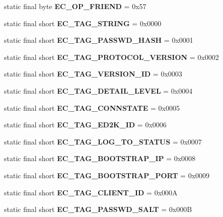 \begin{DoxyCompactItemize}
\item 
static final byte {\bfseries EC\_\-OP\_\-FRIEND} = 0x57\label{interfaceECCodes_a10bfecdbb1cc2c79bb9e923ce445c28b}

\item 
static final short {\bfseries EC\_\-TAG\_\-STRING} = 0x0000\label{interfaceECCodes_a87886149b79ca2ed2e123476cb9410b1}

\item 
static final short {\bfseries EC\_\-TAG\_\-PASSWD\_\-HASH} = 0x0001\label{interfaceECCodes_af173ae339225661cd5433189fec1436a}

\item 
static final short {\bfseries EC\_\-TAG\_\-PROTOCOL\_\-VERSION} = 0x0002\label{interfaceECCodes_a3a16cfe5eee80c6a86da32ccba5cba72}

\item 
static final short {\bfseries EC\_\-TAG\_\-VERSION\_\-ID} = 0x0003\label{interfaceECCodes_a157944884bcc9ddff5e21fd1bd7a3dcf}

\item 
static final short {\bfseries EC\_\-TAG\_\-DETAIL\_\-LEVEL} = 0x0004\label{interfaceECCodes_a93aa9f1582d5e7841c6c7ad1fd397ab8}

\item 
static final short {\bfseries EC\_\-TAG\_\-CONNSTATE} = 0x0005\label{interfaceECCodes_a30cfad3c75ddccabaa5afc08ffe8347d}

\item 
static final short {\bfseries EC\_\-TAG\_\-ED2K\_\-ID} = 0x0006\label{interfaceECCodes_a9342cb799fb30c03f93be3b353736a3f}

\item 
static final short {\bfseries EC\_\-TAG\_\-LOG\_\-TO\_\-STATUS} = 0x0007\label{interfaceECCodes_a499f53defc38bc33b1cd693fc0705157}

\item 
static final short {\bfseries EC\_\-TAG\_\-BOOTSTRAP\_\-IP} = 0x0008\label{interfaceECCodes_aace6917d51dfdc9265653066154f03db}

\item 
static final short {\bfseries EC\_\-TAG\_\-BOOTSTRAP\_\-PORT} = 0x0009\label{interfaceECCodes_ab41787adfb708a32fab6caa73df262e0}

\item 
static final short {\bfseries EC\_\-TAG\_\-CLIENT\_\-ID} = 0x000A\label{interfaceECCodes_af2b1f6bbac7306d8902a999593cd899d}

\item 
static final short {\bfseries EC\_\-TAG\_\-PASSWD\_\-SALT} = 0x000B\label{interfaceECCodes_a376979d10e0ff8049f8b49db9628aa2a}


\end{DoxyCompactItemize}

